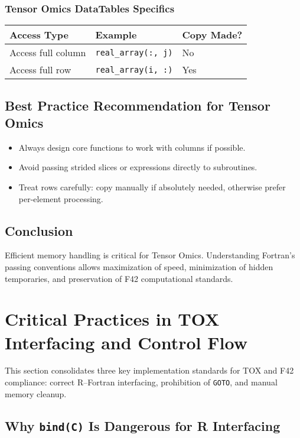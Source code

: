 \documentclass{article}
\begin{document}
\subsubsection{Tensor Omics DataTables Specifics}

\begin{center}
\begin{tabular}{|l|l|l|}
\hline
\textbf{Access Type} & \textbf{Example} & \textbf{Copy Made?} \\
\hline
Access full column & \texttt{real\_array(:, j)} & No \\
Access full row & \texttt{real\_array(i, :)} & Yes \\
\hline
\end{tabular}
\end{center}

\subsection{Best Practice Recommendation for Tensor Omics}

\begin{itemize}
    \item Always design core functions to work with columns if possible.
    \item Avoid passing strided slices or expressions directly to subroutines.
    \item Treat rows carefully: copy manually if absolutely needed, otherwise prefer per-element processing.
\end{itemize}

\subsection{Conclusion}

Efficient memory handling is critical for Tensor Omics.  
Understanding Fortran's passing conventions allows maximization of speed, minimization of hidden temporaries, and preservation of F42 computational standards.

\section{Critical Practices in TOX Interfacing and Control Flow}

This section consolidates three key implementation standards for TOX and F42 compliance: correct R–Fortran interfacing, prohibition of \texttt{GOTO}, and manual memory cleanup.

\subsection{Why \texttt{bind(C)} Is Dangerous for R Interfacing}
\end{document}
